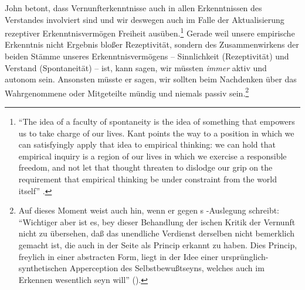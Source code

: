 \begin{nummerierung}
John  betont, dass Vernunfterkenntnisse
auch in allen Erkenntnissen des Verstandes involviert sind und wir deswegen auch
im Falle der Aktualisierung rezeptiver Erkenntnisvermögen Freiheit
ausüben.\footnote{\enquote{The idea of a faculty of spontaneity is the idea of
something that empowers us to take charge of our lives. Kant points the way to a
position in which we can satisfyingly apply that idea to empirical thinking: we
can hold that empirical inquiry is a region of our lives in which we exercise a
responsible freedom, and not let that thought threaten to dislodge our grip on
the requirement that empirical thinking be under constraint from the world
itself} \parencite[][43]{McDowell:MindandWorld1994}.}
Gerade weil unsere empirische Erkenntnis nicht Ergebnis bloßer Rezeptivität,
sondern des Zusammenwirkens der beiden Stämme unseres Erkenntnisvermögens --
Sinnlichkeit (Rezeptivität) und Verstand (Spon\-ta\-ne\-i\-tät) -- ist, kann
 sagen, wir müssten \emph{immer} aktiv und autonom sein.
Ansonsten müsste er sagen, wir sollten beim Nachdenken über das Wahrgenommene
oder Mitgeteilte mündig und niemals passiv sein.\footnote{Auf dieses Moment
weist auch  hin, wenn er gegen s -Auslegung schreibt:
\enquote{Wichtiger aber ist es, bey dieser Behandlung der ischen Kritik der Vernunft nicht zu
übersehen, daß das unendliche Verdienst derselben nicht bemerklich gemacht ist,
die  auch in der  Seite als Princip
erkannt zu haben. Dies Princip, freylich in einer abstracten Form, liegt in der
Idee einer ursprünglich-synthetischen Apperception des Selbstbewußtseyns,
welches auch im Erkennen wesentlich
 seyn will}
\mkbibparens{\cite[][XV: 16.14--19]{Hegel:GesammelteWerke}}.}


\end{nummerierung}
